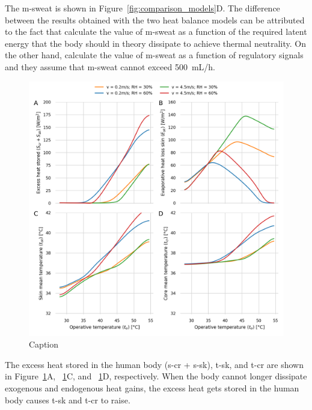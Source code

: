 The \acf{m-sweat} is shown in Figure~\ref{fig:comparison_models}D\@.
The difference between the results obtained with the two heat balance models can be attributed to the fact that \citeauthor{Jay2015} calculate the value of \ac{m-sweat} as a function of the required latent energy that the body should in theory dissipate to achieve thermal neutrality.
On the other hand, \citeauthor{GaggeSET} calculate the value of \ac{m-sweat} as a function of regulatory signals and they assume that \ac{m-sweat} cannot exceed 500~mL/h.

\begin{figure}[thb!]
    \centering
    \includegraphics[width=\textwidth]{figures/results_model_2.png}
    \caption{Caption}
    \label{fig:results_model_2}
\end{figure}

The excess heat stored in the human body (\acs{s-cr} + \acs{s-sk}), \ac{t-sk}, and \ac{t-cr} are shown in Figure~\ref{fig:results_model_2}A, ~\ref{fig:results_model_2}C, and ~\ref{fig:results_model_2}D, respectively.
When the body cannot longer dissipate exogenous and endogenous heat gains, the excess heat gets stored in the human body causes \ac{t-sk} and \ac{t-cr} to raise.

